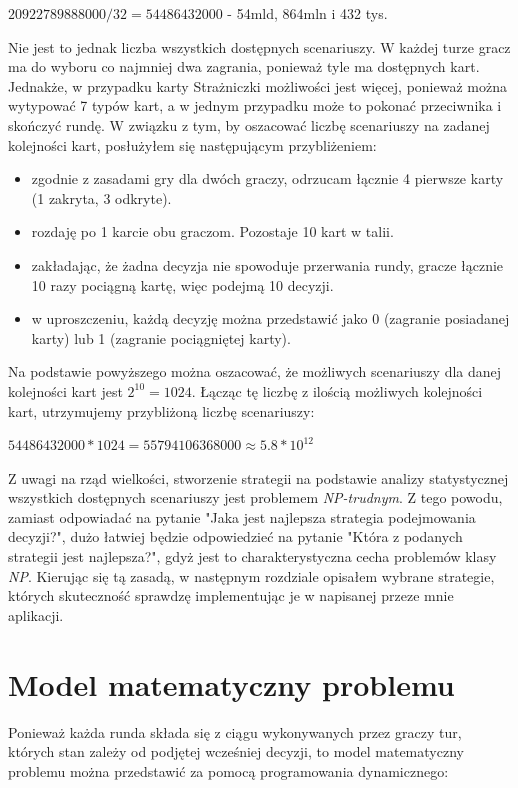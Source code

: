 \begin{center}
	$20 922 789 888 000 / 32 = 54486432000$ - 54mld, 864mln i 432 tys.
\end{center}

Nie jest to jednak liczba wszystkich dostępnych scenariuszy. W każdej turze gracz ma do wyboru co najmniej dwa zagrania, ponieważ tyle ma dostępnych kart. Jednakże, w przypadku karty Strażniczki możliwości jest więcej, ponieważ można wytypować 7 typów kart, a w jednym przypadku może to pokonać przeciwnika i skończyć rundę. W związku z tym, by oszacować liczbę scenariuszy na zadanej kolejności kart, posłużyłem się następującym przybliżeniem:
\begin{itemize}
	\item zgodnie z zasadami gry dla dwóch graczy, odrzucam łącznie 4 pierwsze karty (1 zakryta, 3 odkryte).
	\item rozdaję po 1 karcie obu graczom. Pozostaje 10 kart w talii.
	\item zakładając, że żadna decyzja nie spowoduje przerwania rundy, gracze łącznie 10 razy pociągną kartę, więc podejmą 10 decyzji.
	\item w uproszczeniu, każdą decyzję można przedstawić jako 0 (zagranie posiadanej karty) lub 1 (zagranie pociągniętej karty).
\end{itemize}
Na podstawie powyższego można oszacować, że możliwych scenariuszy dla danej kolejności kart jest $2^{10}=1024$. Łącząc tę liczbę z ilością możliwych kolejności kart, utrzymujemy przybliżoną liczbę scenariuszy:

\begin{center}
	$54486432000 * 1024 = 55794106368000 \approx  5.8*10^{12}$
\end{center}

Z uwagi na rząd wielkości, stworzenie strategii na podstawie analizy statystycznej wszystkich dostępnych scenariuszy jest problemem \textit{NP-trudnym}. Z tego powodu, zamiast odpowiadać na pytanie "Jaka jest najlepsza strategia podejmowania decyzji?", dużo łatwiej będzie odpowiedzieć na pytanie "Która z podanych strategii jest najlepsza?", gdyż jest to charakterystyczna cecha problemów klasy \textit{NP}. Kierując się tą zasadą, w następnym rozdziale opisałem wybrane strategie, których skuteczność sprawdzę implementując je w napisanej przeze mnie aplikacji.


\section{Model matematyczny problemu}
Ponieważ każda runda składa się z ciągu wykonywanych przez graczy tur, których stan zależy od podjętej wcześniej decyzji, to model matematyczny problemu można przedstawić za pomocą programowania dynamicznego:

